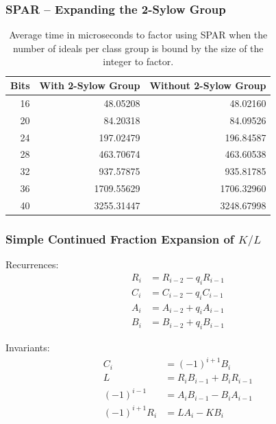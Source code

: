 \documentclass{beamer}
\begin{document}
\begin{frame}
\frametitle{SPAR -- Expanding the 2-Sylow Group}
\begin{table}
\centering
\begin{tabular}{| r | r | r |}
	\hline
	Bits & With 2-Sylow Group & Without 2-Sylow Group \\
	\hline
	16 &   48.05208 &   48.02160 \\
	20 &   84.20318 &   84.09526 \\
	24 &  197.02479 &  196.84587 \\
	28 &  463.70674 &  463.60538 \\
	32 &  937.57875 &  935.81785 \\
	36 & 1709.55629 & 1706.32960 \\
	40 & 3255.31447 & 3248.67998 \\
	\hline
\end{tabular}
\caption{Average time in microseconds to factor using SPAR when the number of ideals per class group is bound by the size of the integer to factor.}
\end{table}
\end{frame}

\begin{frame}
\frametitle{Simple Continued Fraction Expansion of $K / L$}
Recurrences:
\begin{align*}
R_i &= R_{i-2} - q_i R_{i-1} \\
C_i &= C_{i-2} - q_i C_{i-1} \\
A_i &= A_{i-2} + q_i A_{i-1} \\
B_i &= B_{i-2} + q_i B_{i-1}
\end{align*}

Invariants:
\begin{align*}
C_i &= (-1)^{i+1} B_i \\
L &= R_iB_{i-1} + B_iR_{i-1} \\
(-1)^{i-1} &= A_iB_{i-1} - B_iA_{i-1} \\
(-1)^{i+1} R_i &= LA_i - KB_i \\
\end{align*}
\end{frame}
\end{document}
